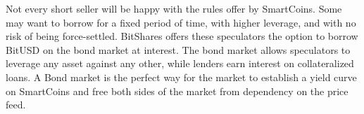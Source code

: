 Not every short seller will be happy with the rules offer by SmartCoins. Some
may want to borrow for a fixed period of time, with higher leverage, and with
no risk of being force-settled. BitShares offers these speculators the option
to borrow BitUSD on the bond market at interest. The bond market allows
speculators to leverage any asset against any other, while lenders earn
interest on collateralized loans. A Bond market is the perfect way for the
market to establish a yield curve on SmartCoins and free both sides of the
market from dependency on the price feed.
